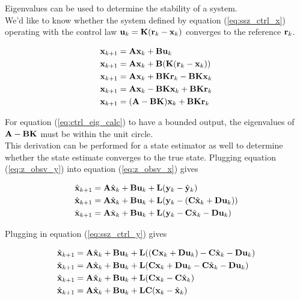 Eigenvalues can be used to determine the stability of a \gls{system}. \\

We'd like to know whether the \gls{system} defined by equation
(\ref{eq:ssz_ctrl_x}) operating with the \gls{control law}
$\mathbf{u}_k = \mathbf{K}(\mathbf{r}_k - \mathbf{x}_k)$ converges to the \gls{reference}
$\mathbf{r}_k$.

\begin{align}
  \mtx{x}_{k+1} &= \mtx{A}\mtx{x}_k + \mtx{B}\mtx{u}_k \nonumber \\
  \mtx{x}_{k+1} &= \mtx{A}\mtx{x}_k + \mtx{B}(\mtx{K}(\mtx{r}_k - \mtx{x}_k))
    \nonumber \\
  \mtx{x}_{k+1} &= \mtx{A}\mtx{x}_k + \mtx{B}\mtx{K}\mtx{r}_k -
    \mtx{B}\mtx{K}\mtx{x}_k \nonumber \\
  \mtx{x}_{k+1} &= \mtx{A}\mtx{x}_k - \mtx{B}\mtx{K}\mtx{x}_k +
    \mtx{B}\mtx{K}\mtx{r}_k \nonumber \\
  \mtx{x}_{k+1} &= (\mtx{A} - \mtx{B}\mtx{K})\mtx{x}_k +
    \mtx{B}\mtx{K}\mtx{r}_k \label{eq:ctrl_eig_calc}
\end{align}

For equation (\ref{eq:ctrl_eig_calc}) to have a bounded output, the eigenvalues
of $\mathbf{A} - \mathbf{B}\mathbf{K}$ must be within the unit circle. \\

This derivation can be performed for a \gls{state} estimator as well to
determine whether the \gls{state} estimate converges to the true \gls{state}.
Plugging equation (\ref{eq:z_obsv_y}) into equation (\ref{eq:z_obsv_x}) gives

\begin{align*}
  \hat{\mathbf{x}}_{k+1} &= \mathbf{A}\hat{\mathbf{x}}_k + \mathbf{B}\mathbf{u}_k +
    \mathbf{L} (\mathbf{y}_k - \hat{\mathbf{y}}_k) \\
  \hat{\mathbf{x}}_{k+1} &= \mathbf{A}\hat{\mathbf{x}}_k + \mathbf{B}\mathbf{u}_k +
    \mathbf{L} (\mathbf{y}_k - (\mathbf{C}\hat{\mathbf{x}}_k + \mathbf{D}\mathbf{u}_k)) \\
  \hat{\mathbf{x}}_{k+1} &= \mathbf{A}\hat{\mathbf{x}}_k + \mathbf{B}\mathbf{u}_k +
    \mathbf{L} (\mathbf{y}_k - \mathbf{C}\hat{\mathbf{x}}_k - \mathbf{D}\mathbf{u}_k)
\end{align*}

Plugging in equation (\ref{eq:ssz_ctrl_y}) gives

\begin{align*}
  \hat{\mathbf{x}}_{k+1} &= \mathbf{A}\hat{\mathbf{x}}_k + \mathbf{B}\mathbf{u}_k +
    \mathbf{L}((\mathbf{C}\mathbf{x}_k + \mathbf{D}\mathbf{u}_k) - \mathbf{C}\hat{\mathbf{x}}_k -
    \mathbf{D}\mathbf{u}_k) \\
  \hat{\mathbf{x}}_{k+1} &= \mathbf{A}\hat{\mathbf{x}}_k + \mathbf{B}\mathbf{u}_k +
    \mathbf{L}(\mathbf{C}\mathbf{x}_k + \mathbf{D}\mathbf{u}_k - \mathbf{C}\hat{\mathbf{x}}_k -
    \mathbf{D}\mathbf{u}_k) \\
  \hat{\mathbf{x}}_{k+1} &= \mathbf{A}\hat{\mathbf{x}}_k + \mathbf{B}\mathbf{u}_k +
    \mathbf{L}(\mathbf{C}\mathbf{x}_k - \mathbf{C}\hat{\mathbf{x}}_k) \\
  \hat{\mathbf{x}}_{k+1} &= \mathbf{A}\hat{\mathbf{x}}_k + \mathbf{B}\mathbf{u}_k +
    \mathbf{L}\mathbf{C}(\mathbf{x}_k - \hat{\mathbf{x}}_k)
\end{align*}


